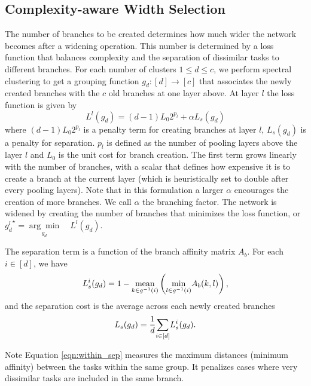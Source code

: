 \documentclass[10pt,twocolumn,letterpaper]{article}
\begin{document}
\subsection{Complexity-aware Width Selection}
\label{sec:width_sel}

The number of branches to be created determines how much wider the network becomes after a widening operation. This number is determined by a loss function that balances complexity and the separation of dissimilar tasks to different branches. For each number of clusters $1\leq d \leq c$, we perform spectral clustering to get a grouping function $g_d: [d] \to [c]$ that associates the newly created branches with the $c$ old branches at one layer above. At layer $l$ the loss function is given by
\begin{equation}
\label{eqn:cost_widen}
L^l(g_d) = (d-1) L_0 2^{p_l} + \alpha L_s(g_d)
\end{equation}
\noindent where $(d-1) L_0 2^{p_l}$ is a penalty term for creating branches at layer $l$, $L_s(g_d)$ is a penalty for separation. $p_l$ is defined as the number of pooling layers above the layer $l$ and $L_0$ is the unit cost for branch creation. The first term grows linearly with the number of branches, with a scalar that defines how expensive it is to create a branch at the current layer (which is heuristically set to double after every pooling layers). Note that in this formulation a larger $\alpha$ encourages the creation of more branches. We call $\alpha$ the branching factor. The network is widened by creating the number of branches that minimizes the loss function, or ${g_d^{l}}^{\star} = \underset{g_d}{\arg\min}\quad {L^l(g_d)}$.

The separation term is a function of the branch affinity matrix $A_b$. For each $i \in [d]$, we have
\begin{equation}
\vspace{-2mm}
\label{eqn:within_sep}
L_s^{i}(g_d) = 1 - \underset{k \in g^{-1}(i)}{\mbox{mean}}\left(\underset{l \in g^{-1}(i) }{\min}{A_b(k,l)}\right),
\end{equation}
\noindent and the separation cost is the average across each newly created branches
\begin{equation}
\vspace{-2mm}
L_s(g_d) = \frac{1}{d} \underset{i \in [d]}{\sum} L_s^i(g_d).
\end{equation}

Note Equation \ref{eqn:within_sep} measures the maximum distances (minimum affinity) between the tasks within the same group. It penalizes cases where very dissimilar tasks are included in the same branch. 
\end{document}
